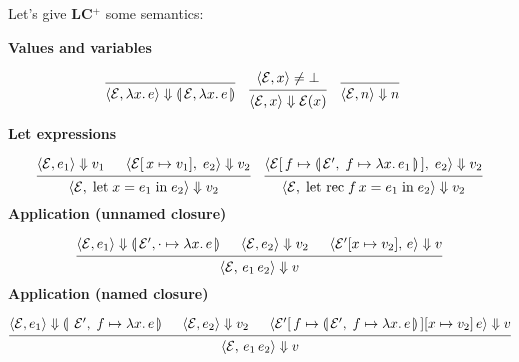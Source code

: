 \newpage 

\noindent
Let's give \textbf{LC$^+$} some semantics:
\begin{Example}

    \textbf{Values and variables}

\[
\begin{matrix}
\begin{prooftree}
  \infer0{
    \langle\mathcal{E}, \lambda x.\,e\rangle \Downarrow \llp \mathcal{E}, \lambda x.\,e\rrp
  }
\end{prooftree}
&
\begin{prooftree}
    \hypo{\langle\mathcal{E}, x\rangle \neq \bot}
  \infer1{
    \langle\mathcal{E}, x\rangle \Downarrow \mathcal{E}(x)
  }
\end{prooftree}
&
\begin{prooftree}
  \infer0{
    \langle\mathcal{E}, n\rangle \Downarrow n
  }
\end{prooftree}
&
\end{matrix}
\]


\noindent
\textbf{Let expressions}

\[
\begin{matrix}
\begin{prooftree}
  \hypo{\langle\mathcal{E}, e_{1}\rangle \Downarrow v_{1}}
  \hypo{\langle\mathcal{E}[\,x \mapsto v_{1}],\; e_{2}\rangle \Downarrow v_2}
  \infer2{
    \langle\mathcal{E},\; \text{let}\; x = e_{1}\; \text{in}\; e_{2}\rangle \Downarrow v_2
  }
\end{prooftree}
&
\begin{prooftree}
  \hypo{\langle\mathcal{E}[\,f \mapsto \llp \mathcal{E}',\;f\mapsto\lambda x.\,e_1\rrp\,],\; e_{2}\rangle \Downarrow v_2}
  \infer1{
    \langle\mathcal{E},\; \text{let rec}\; f\,x = e_{1}\; \text{in}\; e_{2}\rangle \Downarrow v_2
  }
\end{prooftree}
\end{matrix}
\]
\noindent
\textbf{Application (unnamed closure)}

\[
\begin{prooftree}
  \hypo{\langle\mathcal{E}, e_{1}\rangle \Downarrow \llp \mathcal{E}', \cdot \mapsto\lambda x.\,e\rrp}
  \hypo{\langle\mathcal{E}, e_{2}\rangle \Downarrow v_{2}}
  \hypo{\langle\mathcal{E}'[x \mapsto v_{2}],\, e\rangle \Downarrow v}
  \infer3{
    \langle\mathcal{E},\, e_{1}\,e_{2}\rangle \Downarrow v
  }
\end{prooftree}
\]
\noindent
\textbf{Application (named closure)}

\[
\begin{prooftree}
  \hypo{\langle\mathcal{E}, e_{1}\rangle \Downarrow \llp \;\mathcal{E}',\;f\mapsto \lambda x.\,e \rrp}
  \hypo{\langle\mathcal{E}, e_{2}\rangle \Downarrow v_{2}}
  \hypo{\langle\mathcal{E}'[\,f \mapsto \llp \mathcal{E}',\;f\mapsto\lambda x.\,e\rrp\,][x \mapsto v_{2}]\,e\rangle \Downarrow v}
  \infer3{
    \langle\mathcal{E},\, e_{1}\,e_{2}\rangle \Downarrow v
  }
\end{prooftree}
\]
\end{Example}

